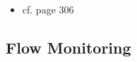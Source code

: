 \begin{itemize}
	\item cf. \textcite{Whitman2009} page 306 
\end{itemize}

\subsection{Flow Monitoring}
\label{sec:background:network:netflow}

